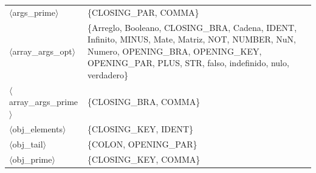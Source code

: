 \documentclass[10pt]{article}
\begin{document}
{\begin{longtable}{@{} p{3.5cm} p{13cm} @{}}
  \parbox[t]{3.3cm}{\raggedright$\langle$args\_\allowbreak{}prime$\rangle$} & \{CLOSING\_PAR, COMMA\} \\
  \parbox[t]{3.3cm}{\raggedright$\langle$array\_\allowbreak{}args\_\allowbreak{}opt$\rangle$} & \{Arreglo, Booleano, CLOSING\_BRA, Cadena, IDENT, Infinito, MINUS, Mate, Matriz, NOT, NUMBER, NuN, Numero, OPENING\_BRA, OPENING\_KEY, OPENING\_PAR, PLUS, STR, falso, indefinido, nulo, verdadero\} \\
  \parbox[t]{3.3cm}{\raggedright$\langle$array\_\allowbreak{}args\_\allowbreak{}prime$\rangle$} & \{CLOSING\_BRA, COMMA\} \\
  \parbox[t]{3.3cm}{\raggedright$\langle$obj\_\allowbreak{}elements$\rangle$} & \{CLOSING\_KEY, IDENT\} \\
  \parbox[t]{3.3cm}{\raggedright$\langle$obj\_\allowbreak{}tail$\rangle$} & \{COLON, OPENING\_PAR\} \\
  \parbox[t]{3.3cm}{\raggedright$\langle$obj\_\allowbreak{}prime$\rangle$} & \{CLOSING\_KEY, COMMA\} \\
  \bottomrule
\end{longtable}
}
\end{document}
